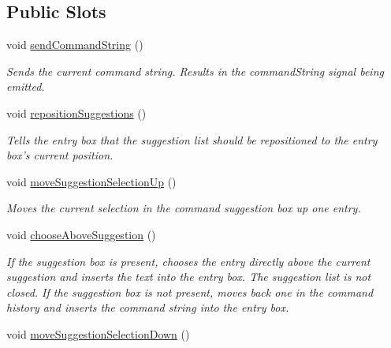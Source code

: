 \subsection*{Public Slots}
\begin{DoxyCompactItemize}
\item 
\hypertarget{class_command_entry_box_a8310199329ce545fefd767066631250b}{void \hyperlink{class_command_entry_box_a8310199329ce545fefd767066631250b}{send\-Command\-String} ()}\label{class_command_entry_box_a8310199329ce545fefd767066631250b}

\begin{DoxyCompactList}\small\item\em Sends the current command string. Results in the command\-String signal being emitted. \end{DoxyCompactList}\item 
\hypertarget{class_command_entry_box_a238530c1dbe9c56b872759b4dec70239}{void \hyperlink{class_command_entry_box_a238530c1dbe9c56b872759b4dec70239}{reposition\-Suggestions} ()}\label{class_command_entry_box_a238530c1dbe9c56b872759b4dec70239}

\begin{DoxyCompactList}\small\item\em Tells the entry box that the suggestion list should be repositioned to the entry box's current position. \end{DoxyCompactList}\item 
\hypertarget{class_command_entry_box_ae40495ddfe607385ba9a0d00f30c5757}{void \hyperlink{class_command_entry_box_ae40495ddfe607385ba9a0d00f30c5757}{move\-Suggestion\-Selection\-Up} ()}\label{class_command_entry_box_ae40495ddfe607385ba9a0d00f30c5757}

\begin{DoxyCompactList}\small\item\em Moves the current selection in the command suggestion box up one entry. \end{DoxyCompactList}\item 
\hypertarget{class_command_entry_box_a4a95a141eba1cc7869fbcf47af3ac972}{void \hyperlink{class_command_entry_box_a4a95a141eba1cc7869fbcf47af3ac972}{choose\-Above\-Suggestion} ()}\label{class_command_entry_box_a4a95a141eba1cc7869fbcf47af3ac972}

\begin{DoxyCompactList}\small\item\em If the suggestion box is present, chooses the entry directly above the current suggestion and inserts the text into the entry box. The suggestion list is not closed. If the suggestion box is not present, moves back one in the command history and inserts the command string into the entry box. \end{DoxyCompactList}\item 
\hypertarget{class_command_entry_box_a306ce6835a28f12b3c7103b01dd7be1a}{void \hyperlink{class_command_entry_box_a306ce6835a28f12b3c7103b01dd7be1a}{move\-Suggestion\-Selection\-Down} ()}\label{class_command_entry_box_a306ce6835a28f12b3c7103b01dd7be1a}


\end{DoxyCompactItemize}
